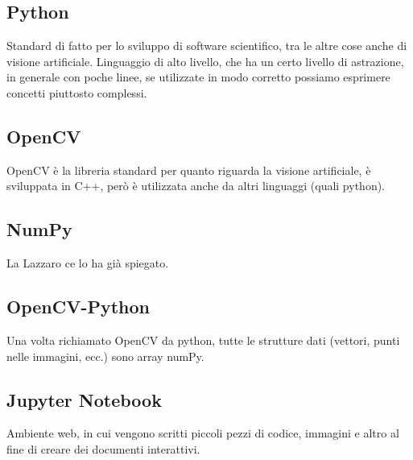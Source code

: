 \subsection{Python}
Standard di fatto per lo sviluppo di software scientifico, tra le altre cose anche di visione artificiale. Linguaggio di alto livello, che ha un certo livello di astrazione, in generale con poche linee, se utilizzate in modo corretto possiamo esprimere concetti piuttosto complessi.

\subsection{OpenCV}
OpenCV è la libreria standard per quanto riguarda la visione artificiale, è sviluppata in C++, però è utilizzata anche da altri linguaggi (quali python).

\subsection{NumPy}
La Lazzaro ce lo ha già spiegato.

\subsection{OpenCV-Python}
Una volta richiamato OpenCV da python, tutte le strutture dati (vettori, punti nelle immagini, ecc.) sono array numPy.

\subsection{Jupyter Notebook}

Ambiente web, in cui vengono scritti piccoli pezzi di codice, immagini e altro al fine di creare dei documenti interattivi.
